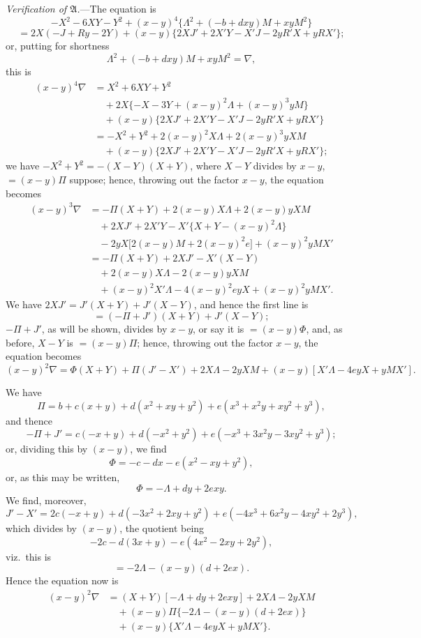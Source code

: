 \documentclass[11pt]{article}
\begin{document}
\medskip
\noindent\textit{Verification of $\mathfrak{A}$.}---The equation is
\[
-X^2 - 6XY - Y^2 + (x - y)^4\bigl\{\Lambda^2 + (-b + dxy)M + xyM^2\bigr\}
\]
\[
= 2X(-J + Ry - 2Y) + (x - y)\{2XJ' + 2X'Y - X'J - 2yR'X + yRX'\};
\]
or, putting for shortness
\[
\Lambda^2 + (-b + dxy)M + xyM^2 = \nabla,
\]
this is
\begin{align*}
(x - y)^4 \nabla &= X^2 + 6XY + Y^2\\
&\quad + 2X\{-X - 3Y + (x - y)^2\Lambda + (x - y)^3 yM\}\\
&\quad + (x - y)\{2XJ' + 2X'Y - X'J - 2yR'X + yRX'\}\\
&= -X^2 + Y^2 + 2(x - y)^2 X\Lambda + 2(x - y)^3 yXM\\
&\quad + (x - y)\{2XJ' + 2X'Y - X'J - 2yR'X + yRX'\};
\end{align*}
we have $-X^2 + Y^2 = -(X - Y)(X + Y)$, where $X - Y$ divides by $x - y$, $=(x - y)\Pi$ suppose; hence, throwing out the factor $x - y$, the equation becomes
\begin{align*}
(x - y)^3 \nabla &= -\Pi(X + Y) + 2(x - y)X\Lambda + 2(x - y)yXM\\
&\quad + 2XJ' + 2X'Y - X'\{X + Y - (x - y)^2\Lambda\}\\
&\quad - 2yX\bigl[2(x - y)M + 2(x - y)^2 e\bigr] + (x - y)^2 yMX'\\
&= -\Pi(X + Y) + 2XJ' - X'(X - Y)\\
&\quad + 2(x - y)X\Lambda - 2(x - y)yXM\\
&\quad + (x - y)^2 X'\Lambda - 4(x - y)^2 eyX + (x - y)^2 yMX'.
\end{align*}
We have $2XJ' = J'(X + Y) + J'(X - Y)$, and hence the first line is
\[
= (-\Pi + J')(X + Y) + J'(X - Y);
\]
$-\Pi + J'$, as will be shown, divides by $x - y$, or say it is $=(x - y)\Phi$, and, as before, $X - Y$ is $=(x - y)\Pi$; hence, throwing out the factor $x - y$, the equation becomes
\[
(x - y)^2 \nabla = \Phi(X + Y) + \Pi(J' - X') + 2X\Lambda - 2yXM + (x - y)[X'\Lambda - 4eyX + yMX'].
\]

We have
\[
\Pi = b + c(x + y) + d(x^2 + xy + y^2) + e(x^3 + x^2 y + xy^2 + y^3),
\]
and thence
\[
-\Pi + J' = c(-x + y) + d(-x^2 + y^2) + e(-x^3 + 3x^2 y - 3xy^2 + y^3);
\]
or, dividing this by $(x - y)$, we find
\[
\Phi = -c - dx - e(x^2 - xy + y^2),
\]
or, as this may be written,
\[
\Phi = -\Lambda + dy + 2exy.
\]
We find, moreover,
\[
J' - X' = 2c(-x + y) + d(-3x^2 + 2xy + y^2) + e(-4x^3 + 6x^2 y - 4xy^2 + 2y^3),
\]
which divides by $(x - y)$, the quotient being
\[
-2c - d(3x + y) - e(4x^2 - 2xy + 2y^2),
\]
viz.\ this is
\[
= -2\Lambda - (x - y)(d + 2ex).
\]
Hence the equation now is
\begin{align*}
(x - y)^2 \nabla &= (X + Y)[-\Lambda + dy + 2exy] + 2X\Lambda - 2yXM\\
&\quad + (x - y)\Pi\{-2\Lambda - (x - y)(d + 2ex)\}\\
&\quad + (x - y)\bigl\{X'\Lambda - 4eyX + yMX'\bigr\}.
\end{align*}
\end{document}
